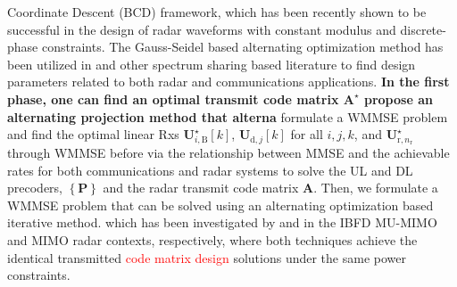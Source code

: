 \documentclass[10pt,journal]{IEEEtran}
\newcommand{\bracket}[1]{{\left [{#1}\right ]}}
\newcommand{\braces}[1]{{\left\{ {#1}\right\}}}
\newcommand{\B}{\textrm{B}}
\newcommand{\rnr}{_{\mathrm{r},n_\mathrm{r}}}
\newcommand{\UBj}{\mathbf{U}_{\textrm{d},j}\bracket{k}}
\theoremstyle{definition}
\begin{document}
Coordinate Descent (BCD) framework, which has been recently
shown to be successful in the design of radar waveforms with constant modulus and discrete-phase constraints. The Gauss-Seidel based alternating optimization method has been utilized in \cite{MCMIMO_RadComm,qian2018joint} and other spectrum sharing based literature to find design parameters related to both radar and communications applications.  \textbf{In the first phase, one can find an optimal transmit code matrix $\mathbf{A}^\star$ propose an alternating projection method that alterna}  formulate a WMMSE problem and find the optimal linear Rxs $\mathbf{U}^\star_{i,\B}\bracket{k}$, $\UBj$ for all $i,j,k$, and $\mathbf{U}^\star\rnr$ through WMMSE before  via the relationship between MMSE and the achievable rates for both communications and radar systems to solve the UL and DL precoders, $\braces{\mathbf{P}}$ and the radar transmit code matrix $\mathbf{A}$. Then, we formulate a WMMSE problem that can be solved using an alternating optimization based iterative method. which has been investigated by \cite{FD_WMMSE} and \cite{mutualinformation_mmse} in the IBFD MU-MIMO and MIMO radar contexts, respectively, where both techniques achieve the identical transmitted \textcolor{red}{code matrix design} solutions under the same power constraints.  
\fi
\end{document}
